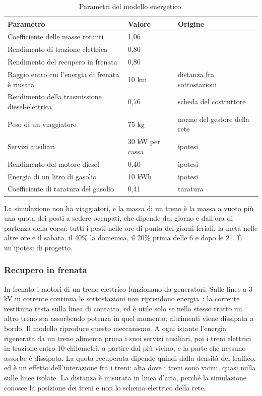 \begin{table}[H]
	\centering
	\caption{Parametri del modello energetico.}
	\label{tab:energia-parametri}
	\begin{tabularx}{\textwidth}{Xll}
		\toprule
		Parametro & Valore & Origine \\
		\midrule
		Coefficiente delle masse rotanti & 1,06 & \cite{dallachiara2015consumo} \\
		Rendimento di trazione elettrica & 0,80 & \cite{andersson2006energy} \\
		Rendimento del recupero in frenata & 0,80 & \cite{andersson2006energy} \\
		Raggio entro cui l'energia di frenata è riusata & 10 km & distanza fra sottostazioni~\cite{minoia_trazione} \\
		Rendimento della trasmissione diesel-elettrica & 0,76 & scheda del costruttore~\cite{stadler_gtw} \\
		Peso di un viaggiatore & 75 kg & norme del gestore della rete~\cite{rfi2005taf} \\
		Servizi ausiliari & 30 kW per cassa & ipotesi \\
		Rendimento del motore diesel & 0,40 & ipotesi \\
		Energia di un litro di gasolio & 10 kWh & ipotesi \\
		Coefficiente di taratura del gasolio & 0,41 & taratura \\
		\bottomrule
	\end{tabularx}
\end{table}

La simulazione non ha viaggiatori, e la massa di un treno è la massa a vuoto più una quota dei posti a sedere occupati, che dipende dal giorno e dall'ora di partenza della corsa: tutti i posti nelle ore di punta dei giorni feriali, la metà nelle altre ore e il sabato, il 40\% la domenica, il 20\% prima delle 6 e dopo le 21. È un'ipotesi di progetto.

\subsubsection{Recupero in frenata}
In frenata i motori di un treno elettrico funzionano da generatori. Sulle linee a 3 kV in corrente continua le sottostazioni non riprendono energia~\cite{andersson2006energy,rfi_energia}: la corrente restituita resta sulla linea di contatto, ed è utile solo se nello stesso tratto un altro treno sta assorbendo potenza in quel momento; altrimenti viene dissipata a bordo. Il modello riproduce questo meccanismo. A ogni istante l'energia rigenerata da un treno alimenta prima i suoi servizi ausiliari, poi i treni elettrici in trazione entro 10 chilometri, a partire dal più vicino, e la parte che nessuno assorbe è dissipata. La quota recuperata dipende quindi dalla densità del traffico, ed è un effetto dell'interazione fra i treni: alta dove i treni sono vicini, quasi nulla sulle linee isolate. La distanza è misurata in linea d'aria, perché la simulazione conosce la posizione dei treni e non lo schema elettrico della rete.

